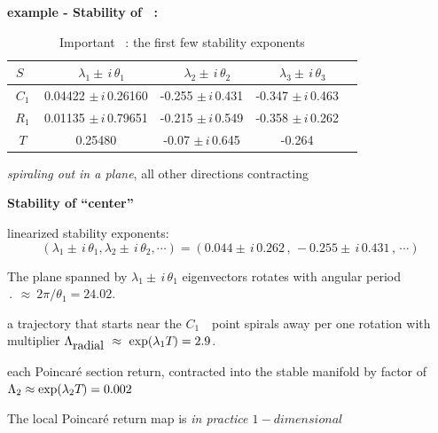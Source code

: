 {\bf example - Stability of \KS\ \eqva:}{
\begin{table}
\caption[Important \KS\ equilibria]{
Important \KS\ \eqva:
the first few stability exponents
}
\begin{center} \footnotesize
\begin{tabular}{@{}ccccc}
\hline %
$~S~~~$ & $~~~~\lambda_1 \pm \,i\,\theta_1$
                                & $~~~~\lambda_2 \pm \,i\,\theta_2$
                                        & $~~~~\lambda_3 \pm \,i\,\theta_3$
\\
\hline %
${C_1}$    &{0.04422 $\pm \,i\,$0.26160}   &-0.255 $\pm \,i\,$0.431
&-0.347 $\pm \,i\,$0.463         \\
\hline %
${R_1}$   &{0.01135 $\pm \,i\,$0.79651} & -0.215 $\pm \,i\,$0.549
&-0.358 $\pm \,i\,$0.262        \\
\hline %
${T}$     & 0.25480  & -0.07 $\pm \,i\,$0.645 &-0.264
\\
\hline %
\end{tabular}
\end{center}
\label{t:stationary}
\end{table}

{\em
spiraling out in a plane}, all other directions contracting


{\bf
Stability of ``center'' \eqv\
    }

linearized stability exponents:
\[ %
(\lambda_{1}\pm\,i\,\theta_{1},\lambda_{2} \pm\,i\,\theta_{2}, \cdots)
    = (0.044 \pm \,i\,0.262\,,\,
        -0.255 \pm \,i\,0.431\,,\,\cdots)
\] %

The plane spanned by $\lambda_{1} \pm\,i\,\theta_{1}$ eigenvectors rotates with angular period
$\period{} ~\approx~2\pi/\theta_{1}=24.02$.

a trajectory
that starts near  the $C_1$~\eqv\ point spirals
away per one rotation
with multiplier
$\Lambda_{\mbox{radial}}~\approx~\exp(\lambda_{1}{T_{}})=2.9$.

each Poincar\' e section return,
contracted into the stable manifold by
factor of
{
$\Lambda_{2}\approx\exp(\lambda_{2}{T_{}})=0.002$
}


The local Poincar\' e return map is
{\em
in practice $1-dimensional$
}
    } %


